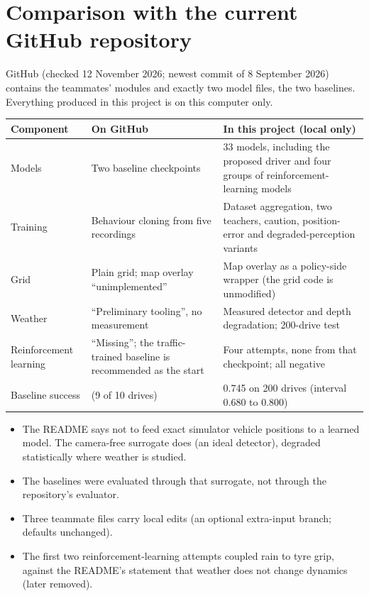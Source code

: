 \section{Comparison with the current GitHub repository}\label{sec:g-github}
\begin{plainwords}
GitHub (checked 12 November 2026; newest commit of 8 September 2026) contains the teammates' modules and exactly two model files, the two baselines. Everything produced in this project is on this computer only.
\end{plainwords}
\begin{center}\small
\begin{tabularx}{\textwidth}{@{}>{\raggedright\arraybackslash}p{3.0cm}>{\raggedright\arraybackslash}p{4.4cm}X@{}}\toprule
Component & On GitHub & In this project (local only)\\\midrule
Models & Two baseline checkpoints & 33 models, including the proposed driver and four groups of reinforcement-learning models\\
Training & Behaviour cloning from five recordings & Dataset aggregation, two teachers, caution, position-error and degraded-perception variants\\
Grid & Plain grid; map overlay ``unimplemented'' & Map overlay as a policy-side wrapper (the grid code is unmodified)\\
Weather & ``Preliminary tooling'', no measurement & Measured detector and depth degradation; 200-drive test\\
Reinforcement learning & ``Missing''; the traffic-trained baseline is recommended as the start & Four attempts, none from that checkpoint; all negative\\
Baseline success & 0.90 (9 of 10 drives) & 0.745 on 200 drives (interval 0.680 to 0.800)\\\bottomrule
\end{tabularx}
\end{center}
\begin{cautionbox}
\begin{itemize}[leftmargin=1.2em,itemsep=1pt]
\item The README says not to feed exact simulator vehicle positions to a learned model. The camera-free surrogate does (an ideal detector), degraded statistically where weather is studied.
\item The baselines were evaluated through that surrogate, not through the repository's evaluator.
\item Three teammate files carry local edits (an optional extra-input branch; defaults unchanged).
\item The first two reinforcement-learning attempts coupled rain to tyre grip, against the README's statement that weather does not change dynamics (later removed).
\end{itemize}
\end{cautionbox}

